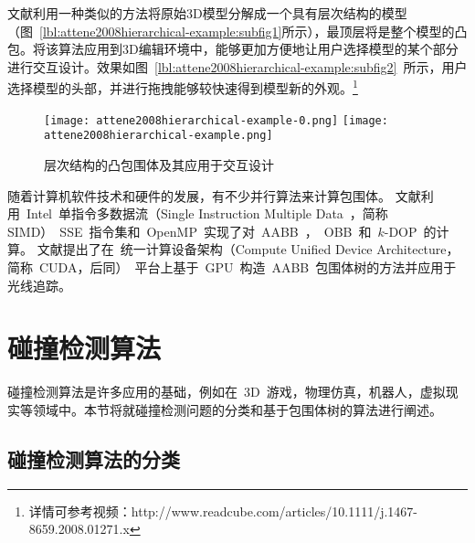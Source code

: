 文献利用一种类似的方法将原始3D模型分解成一个具有层次结构的模型（图~\ref{lbl:attene2008hierarchical-example:subfig1}所示），最顶层将是整个模型的凸包。将该算法应用到3D编辑环境中，能够更加方便地让用户选择模型的某个部分进行交互设计。效果如图~\ref{lbl:attene2008hierarchical-example:subfig2}~所示，用户选择模型的头部，并进行拖拽能够较快速得到模型新的外观。\footnote{详情可参考视频：http://www.readcube.com/articles/10.1111/j.1467-8659.2008.01271.x }
\begin{figure}[htbp]
  \centering
    {\texttt{[image: attene2008hierarchical-example-0.png]}}
    {\texttt{[image: attene2008hierarchical-example.png]}}
  \caption{层次结构的凸包围体及其应用于交互设计\cite{attene2008hierarchical}}
  \label{lbl:attene2008hierarchical-example}
\end{figure}

随着计算机软件技术和硬件的发展，有不少并行算法来计算包围体。
文献利用~Intel~单指令多数据流（Single Instruction
Multiple Data~，简称SIMD）~SSE~指令集和~OpenMP~实现了对~AABB~，~OBB~和~$k$-DOP~的计算。
文献提出了在~统一计算设备架构（Compute Unified Device
Architecture，简称~CUDA，后同）~平台上基于~GPU~构造~AABB~包围体树的方法并应用于光线追踪。

\section{碰撞检测算法}
\label{sec:collisiondetection}

碰撞检测算法是许多应用的基础，例如在~3D~游戏，物理仿真，机器人，虚拟现实等领域中。本节将就碰撞检测问题的分类和基于包围体树的算法进行阐述。

\subsection{碰撞检测算法的分类}
\label{sec:cd-category}

